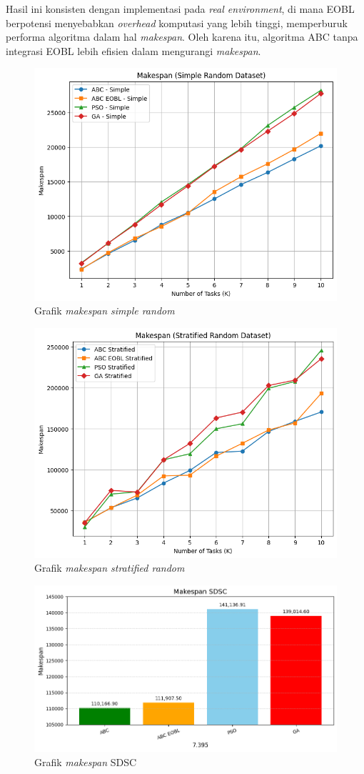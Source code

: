 Hasil ini konsisten dengan implementasi pada \textit{real environment}, di mana EOBL berpotensi menyebabkan \textit{overhead} komputasi yang lebih tinggi, memperburuk performa algoritma dalam hal \textit{makespan}. Oleh karena itu, algoritma ABC tanpa integrasi EOBL lebih efisien dalam mengurangi \textit{makespan}.

\begin{figure} [H]
    \centering
    \includegraphics[width=0.75\linewidth]{gambar/Grafik Makespan Simple Random.png}
    \caption{Grafik \textit{makespan simple random}}
\end{figure}

\newpage

\begin{figure} [H]
    \centering
    \includegraphics[width=0.75\linewidth]{gambar/Grafik Makespan Stratified Random.png}
    \caption{Grafik \textit{makespan stratified random}}
\end{figure}

\begin{figure} [H]
    \centering
    \includegraphics[width=0.75\linewidth]{gambar/Grafik Makespan SDSC.png}
    \caption{Grafik \textit{makespan} SDSC}
\end{figure}

